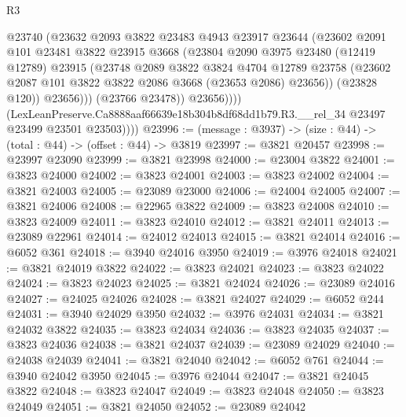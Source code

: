 \begin{lexlean}{R3}
\begin{coremodule}
                      @23740
                      (@23632
                        @2093
                        @3822
                        @23483
                        @4943
                        @23917
                        @23644
                        (@23602
                          @2091
                          @101
                          @23481
                          @3822
                          @23915
                          @3668
                          (@23804
                            @2090
                            @3975
                            @23480
                            (@12419 @12789)
                            @23915
                            (@23748
                              @2089
                              @3822
                              @3824
                              @4704
                              @12789
                              @23758
                              (@23602 @2087 @101 @3822 @3822 @2086 @3668 (@23653 @2086) @23656))
                            (@23828 @120))
                          @23656)))
                    (@23766 @23478))
                  @23656))))
          (LexLeanPreserve.Ca8888aaf66639e18b304b8df68dd1b79.R3.__rel_34
            @23497
            @23499
            @23501
            @23503))))
@23996 := (message : @3937) -> (size : @44) -> (total : @44) -> (offset : @44) -> @3819
@23997 := @3821 @20457
@23998 := @23997 @23090
@23999 := @3821 @23998
@24000 := @23004 @3822
@24001 := @3823 @24000
@24002 := @3823 @24001
@24003 := @3823 @24002
@24004 := @3821 @24003
@24005 := @23089 @23000
@24006 := @24004 @24005
@24007 := @3821 @24006
@24008 := @22965 @3822
@24009 := @3823 @24008
@24010 := @3823 @24009
@24011 := @3823 @24010
@24012 := @3821 @24011
@24013 := @23089 @22961
@24014 := @24012 @24013
@24015 := @3821 @24014
@24016 := @6052 @361
@24018 := @3940 @24016 @3950
@24019 := @3976 @24018
@24021 := @3821 @24019 @3822
@24022 := @3823 @24021
@24023 := @3823 @24022
@24024 := @3823 @24023
@24025 := @3821 @24024
@24026 := @23089 @24016
@24027 := @24025 @24026
@24028 := @3821 @24027
@24029 := @6052 @244
@24031 := @3940 @24029 @3950
@24032 := @3976 @24031
@24034 := @3821 @24032 @3822
@24035 := @3823 @24034
@24036 := @3823 @24035
@24037 := @3823 @24036
@24038 := @3821 @24037
@24039 := @23089 @24029
@24040 := @24038 @24039
@24041 := @3821 @24040
@24042 := @6052 @761
@24044 := @3940 @24042 @3950
@24045 := @3976 @24044
@24047 := @3821 @24045 @3822
@24048 := @3823 @24047
@24049 := @3823 @24048
@24050 := @3823 @24049
@24051 := @3821 @24050
@24052 := @23089 @24042

\end{coremodule}
\end{lexlean}
